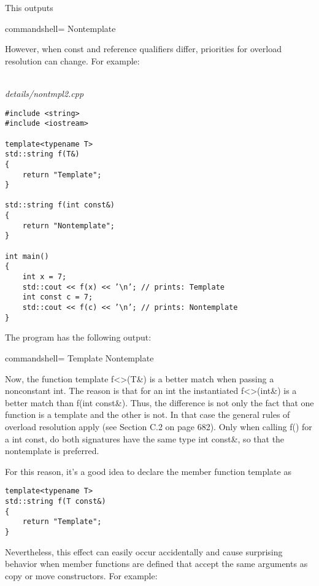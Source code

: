 This outputs

\begin{tcblisting}{commandshell={}}
Nontemplate
\end{tcblisting}

However, when const and reference qualifiers differ, priorities for overload resolution can change. For example:

\hspace*{\fill} \\ %
\noindent
\textit{details/nontmpl2.cpp}
\begin{lstlisting}[style=styleCXX]
#include <string>
#include <iostream>

template<typename T>
std::string f(T&)
{
	return "Template";
}

std::string f(int const&)
{
	return "Nontemplate";
}

int main()
{
	int x = 7;
	std::cout << f(x) << ’\n’; // prints: Template
	int const c = 7;
	std::cout << f(c) << ’\n’; // prints: Nontemplate
}
\end{lstlisting}

The program has the following output:

\begin{tcblisting}{commandshell={}}
Template
Nontemplate
\end{tcblisting}

Now, the function template f<>(T\&) is a better match when passing a nonconstant int. The reason is that for an int the instantiated f<>(int\&) is a better match than f(int const\&). Thus, the difference is not only the fact that one function is a template and the other is not. In that case the general rules of overload resolution apply (see Section C.2 on page 682). Only when calling f() for a int const, do both signatures have the same type int const\&, so that the nontemplate is preferred.

For this reason, it’s a good idea to declare the member function template as

\begin{lstlisting}[style=styleCXX]
template<typename T>
std::string f(T const&)
{
	return "Template";
}
\end{lstlisting}

Nevertheless, this effect can easily occur accidentally and cause surprising behavior when member functions are defined that accept the same arguments as copy or move constructors. For example:

